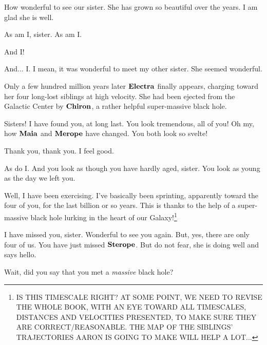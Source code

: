 \documentclass[main.tex]{subfiles}
\begin{document}
\par \Maia How wonderful to see our sister.  She has grown so beautiful over the years.  I am glad she is well.

\par \Merope As am I, sister.  As am I.

\par \Celaeno And I!

\par \Lacedaemon And... I.  I mean, it was wonderful to meet my other sister.  She seemed wonderful.

\par \nar Only a few hundred million years later $\Electra$ finally appears, charging toward her four long-lost siblings at high velocity.  She had been ejected from the Galactic Center by $\Chiron$, a rather helpful super-massive black hole.  

\par \Electra Sisters!  I have found you, at long last.  You look tremendous, all of you!  Oh my, how $\Maia$ and $\Merope$ have changed.  You both look so svelte!

\par \Maia Thank you, thank you.  I feel good.

\par \Merope As do I.  And you look as though you have hardly aged, sister.  You look as young as the day we left you.

\par \Electra Well, I have been exercising.  I've basically been sprinting, apparently toward the four of you, for the last billion or so years.  This is thanks to the help of a super-massive black hole lurking in the heart of our Galaxy!\footnote{IS THIS TIMESCALE RIGHT?  AT SOME POINT, WE NEED TO REVISE THE WHOLE BOOK, WITH AN EYE TOWARD ALL TIMESCALES, DISTANCES AND VELOCITIES PRESENTED, TO MAKE SURE THEY ARE CORRECT/REASONABLE.  THE MAP OF THE SIBLINGS' TRAJECTORIES AARON IS GOING TO MAKE WILL HELP A LOT...}  

\par \Celaeno I have missed you, sister.  Wonderful to see you again.  But, yes, there are only four of us.  You have just missed $\Sterope$.  But do not fear, she is doing well and says hello.

\par \Maia Wait, did you say that you met a \textit{massive} black hole?
\end{document}
